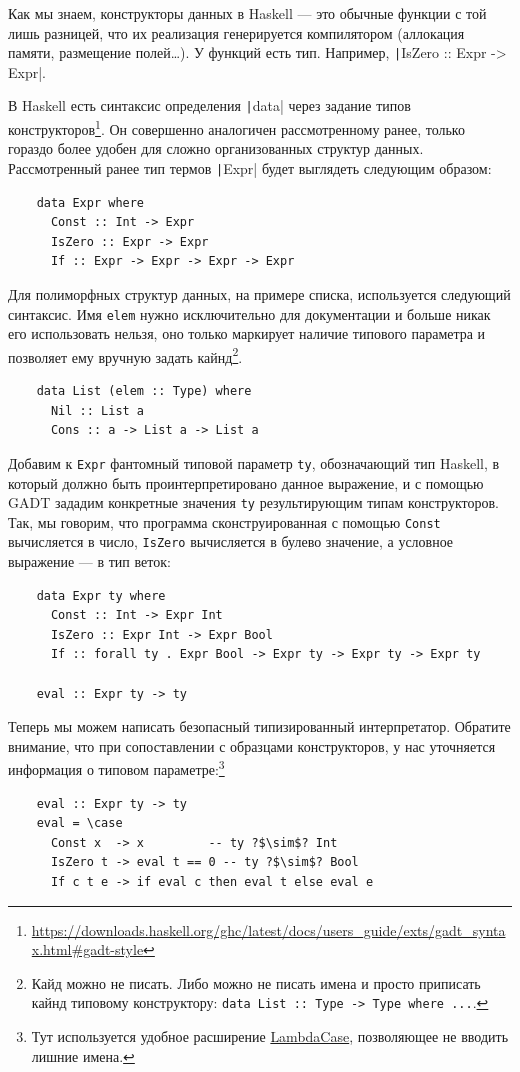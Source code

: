 Как мы знаем, конструкторы данных в Haskell --- это обычные функции с той лишь разницей, что их реализация генерируется компилятором (аллокация памяти, размещение полей\ldots).
У функций есть тип.
Например, \texttt|IsZero :: Expr -> Expr|.

В Haskell есть синтаксис определения \texttt|data| через задание типов конструкторов\footnote{\url{https://downloads.haskell.org/ghc/latest/docs/users_guide/exts/gadt_syntax.html\#gadt-style}}.
Он совершенно аналогичен рассмотренному ранее, только гораздо более удобен для сложно организованных структур данных.
Рассмотренный ранее тип термов \texttt|Expr| будет выглядеть следующим образом:
\begin{verbatim}
    data Expr where
      Const :: Int -> Expr
      IsZero :: Expr -> Expr
      If :: Expr -> Expr -> Expr -> Expr
\end{verbatim}

Для полиморфных структур данных, на примере списка, используется следующий синтаксис.
Имя \texttt{elem} нужно исключительно для документации и больше никак его использовать нельзя, оно только маркирует наличие типового параметра и позволяет ему вручную задать кайнд\footnote{Кайд можно не писать. Либо можно не писать имена и просто приписать кайнд типовому конструктору: \texttt{data List :: Type -> Type where ...}.}.
\begin{verbatim}
    data List (elem :: Type) where
      Nil :: List a
      Cons :: a -> List a -> List a
\end{verbatim}

Добавим к \texttt{Expr} фантомный типовой параметр \texttt{ty}, обозначающий тип Haskell, в который должно быть проинтерпретировано данное выражение, и с помощью GADT зададим конкретные значения \texttt{ty} результирующим типам конструкторов.
Так, мы говорим, что программа сконструированная с помощью \texttt{Const} вычисляется в число, \texttt{IsZero} вычисляется в булево значение, а условное выражение --- в тип веток:
\begin{verbatim}
    data Expr ty where
      Const :: Int -> Expr Int
      IsZero :: Expr Int -> Expr Bool
      If :: forall ty . Expr Bool -> Expr ty -> Expr ty -> Expr ty

    eval :: Expr ty -> ty
\end{verbatim}

Теперь мы можем написать безопасный типизированный интерпретатор.
Обратите внимание, что при сопоставлении с образцами конструкторов, у нас уточняется информация о типовом параметре:\footnote{Тут используется удобное расширение \href{https://downloads.haskell.org/~ghc/9.0.1/docs/html/users_guide/exts/lambda_case.html}{LambdaCase}, позволяющее не вводить лишние имена.}
\begin{verbatim}
    eval :: Expr ty -> ty
    eval = \case
      Const x  -> x         -- ty ?$\sim$? Int
      IsZero t -> eval t == 0 -- ty ?$\sim$? Bool
      If c t e -> if eval c then eval t else eval e
\end{verbatim}

